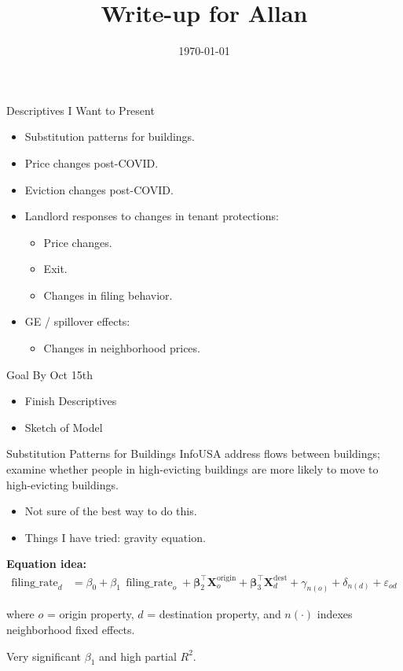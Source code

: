 \documentclass[aspectratio=169]{beamer}
\title{Write-up for Allan}
\date{\today}
\begin{document}


\frame{\titlepage}

\begin{frame}{Descriptives I Want to Present}
\begin{itemize}
  \item Substitution patterns for buildings.
  \item Price changes post-COVID.
  \item Eviction changes post-COVID.
  \item Landlord responses to changes in tenant protections:
    \begin{itemize}
      \item Price changes.
      \item Exit.
      \item Changes in filing behavior.
    \end{itemize}
  \item GE / spillover effects:
    \begin{itemize}
      \item Changes in neighborhood prices.
    \end{itemize}
\end{itemize}
\end{frame}

\begin{frame}{Goal By Oct 15th}
\begin{itemize}
    \item Finish Descriptives
    \item Sketch of Model
\end{itemize}
    
\end{frame}


\begin{frame}{Substitution Patterns for Buildings}
InfoUSA address flows between buildings; examine whether people in high-evicting buildings are more likely to move to high-evicting buildings.
\begin{itemize}
  \item Not sure of the best way to do this.
  \item Things I have tried: gravity equation.
\end{itemize}

\medskip
\textbf{Equation idea:}
\begin{align}
\operatorname{filing\_rate}_{d}
  &= \beta_0 
   + \beta_1\,\operatorname{filing\_rate}_{o}
   + \boldsymbol{\beta}_2^{\top} \mathbf{X}^{\text{origin}}_{o}
   + \boldsymbol{\beta}_3^{\top} \mathbf{X}^{\text{dest}}_{d}
   + \gamma_{n(o)} + \delta_{n(d)} + \varepsilon_{od}
   \label{eq:filing-rate-flows}
\end{align}

{\small where \(o\) = origin property, \(d\) = destination property, and \(n(\cdot)\) indexes neighborhood fixed effects.}

\medskip
Very significant \(\beta_1\) and high partial \(R^2\).
\end{frame}
\end{document}
